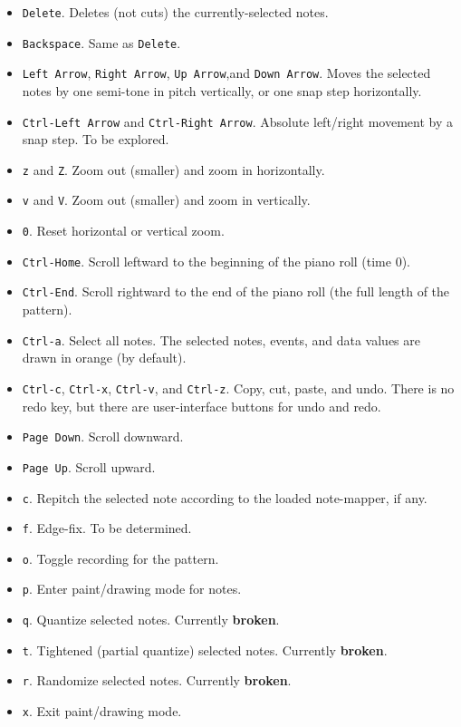    \begin{itemize}
      \item \texttt{Delete}.  Deletes (not cuts) the currently-selected notes.
      \item \texttt{Backspace}.  Same as \texttt{Delete}.
      \item \texttt{Left Arrow}, \texttt{Right Arrow},
         \texttt{Up Arrow},and \texttt{Down Arrow}.
         Moves the selected notes by one semi-tone in pitch vertically, or
         one snap step horizontally.
      \item \texttt{Ctrl-Left Arrow} and \texttt{Ctrl-Right Arrow}.
         Absolute left/right movement by a snap step. To be explored.
      \item \texttt{z} and \texttt{Z}.  Zoom out (smaller) and zoom in
         horizontally.
      \item \texttt{v} and \texttt{V}.  Zoom out (smaller) and zoom in
         vertically.
      \item \texttt{0}. Reset horizontal or vertical zoom.
      \item \texttt{Ctrl-Home}.  Scroll leftward to the beginning of the
         piano roll (time 0).
      \item \texttt{Ctrl-End}.  Scroll rightward to the end of the
         piano roll (the full length of the pattern).
      \item \texttt{Ctrl-a}.  Select all notes.  The selected notes, events,
         and data values are drawn in orange (by default).
      \item \texttt{Ctrl-c}, \texttt{Ctrl-x}, \texttt{Ctrl-v}, and
         \texttt{Ctrl-z}.  Copy, cut, paste, and undo. There is no redo key,
         but there are user-interface buttons for undo and redo.
      \item \texttt{Page Down}.  Scroll downward.
      \item \texttt{Page Up}.  Scroll upward.
      \item \texttt{c}.  Repitch the selected note according to the loaded
         note-mapper, if any.
      \item \texttt{f}.  Edge-fix.  To be determined.
      \item \texttt{o}.  Toggle recording for the pattern.
      \item \texttt{p}.  Enter paint/drawing mode for notes.
      \item \texttt{q}.  Quantize selected notes.
         Currently \textbf{broken}.
      \item \texttt{t}.  Tightened (partial quantize) selected notes.
         Currently \textbf{broken}.
      \item \texttt{r}.  Randomize selected notes.
         Currently \textbf{broken}.
      \item \texttt{x}.  Exit paint/drawing mode.
   \end{itemize}


